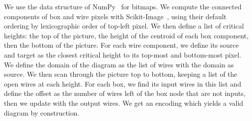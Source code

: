 We use the  data structure of NumPy~\cite{VanDerWaltEtAl11} for bitmaps.
We compute the connected components of box and wire pixels with Scikit-Image~\cite{WaltEtAl14}, using their default ordering by lexicographic order of top-left pixel.
We then define a list of critical heights: the top of the picture, the height of the centroid of each box component, then the bottom of the picture.
For each wire component, we define its source and target as the closest critical height to its top-most and bottom-most pixel.
We define the domain of the diagram as the list of wires with the domain as source.
We then scan through the picture top to bottom, keeping a list  of the open wires at each height.
For each box, we find its input wires in this list and define the offset as the number of wires left of the box node that are not inputs, then we update  with the output wires.
We get an encoding  which yields a valid diagram by construction.

